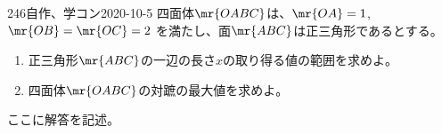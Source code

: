 \begin{thm}{246}{}{自作、学コン2020-10-5}
 四面体$\mr{OABC}$は、$\mr{OA}=1$, $\mr{OB}=\mr{OC}=2$ を満たし、面$\mr{ABC}$は正三角形であるとする。
 \begin{enumerate}
  \item 正三角形$\mr{ABC}$の一辺の長さ$x$の取り得る値の範囲を求めよ。
  \item 四面体$\mr{OABC}$の対蹠の最大値を求めよ。
 \end{enumerate}
\end{thm}

ここに解答を記述。